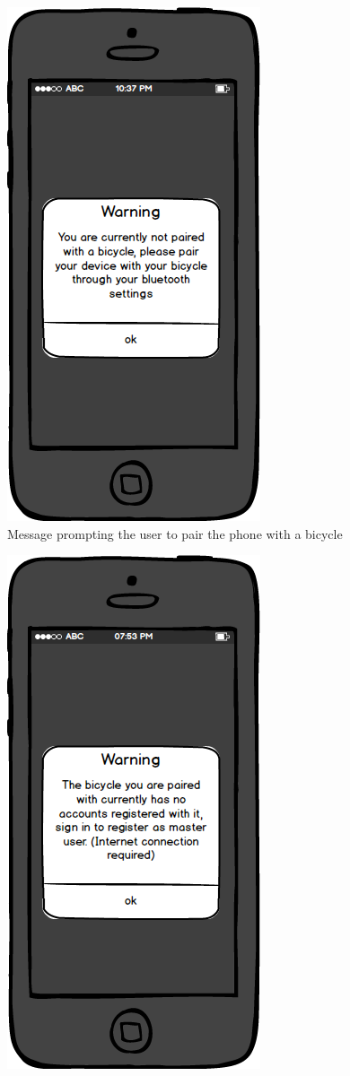 \documentclass[a4paper]{report}
\begin{document}
{\begin{figure}
\includegraphics[scale=0.9]{figures/prototype_2/not_paired}
\caption{Message prompting the user to pair the phone with a bicycle}
\end{figure}
\clearpage
\begin{figure}
\centering
\includegraphics[scale=0.9]{figures/prototype_2/already_reg}

\end{figure}}
\end{document}
